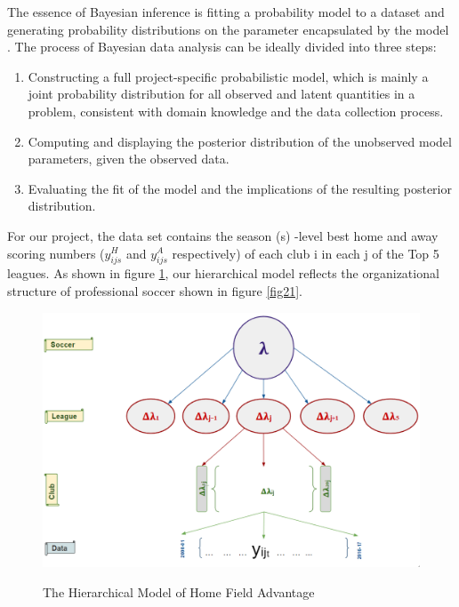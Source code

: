 \documentclass[USenglish]{article}
\begin{document}
The essence of Bayesian inference is fitting a probability model to a dataset and generating probability distributions on the parameter encapsulated by the model \citep{Gelman2014}. The process of Bayesian data analysis can be ideally divided into three steps:

\begin{enumerate}
\item Constructing a full project-specific probabilistic model, which is mainly a joint probability distribution for all observed and latent quantities in a problem, consistent with domain knowledge and the data collection process.
\item Computing and displaying the posterior distribution of the unobserved model parameters, given the observed data.
\item Evaluating the fit of the model and the implications of the resulting posterior distribution.
\end{enumerate}
 
For our project, the data set contains the season (s) -level best home and away scoring numbers ($y^H_{ijs}$ and   $y^A_{ijs}$ respectively) of each club i in each j of the Top 5 leagues. As shown in figure \ref{fig33}, our hierarchical model reflects the organizational structure of professional soccer shown in figure \ref{fig21}.



\begin{figure}
\caption{The Hierarchical Model of Home Field Advantage }
{\includegraphics[width=1.0\linewidth]{HFA_33}}
\label{fig33}
\end{figure} 
\end{document}
